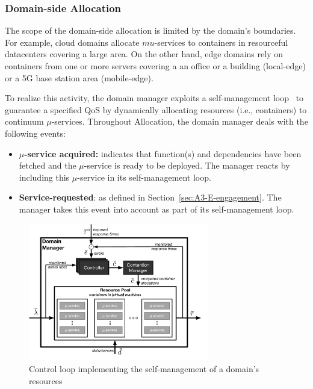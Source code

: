 \subsubsection*{Domain-side Allocation}

The scope of the domain-side allocation is limited by the domain's boundaries. For example, cloud domains allocate $mu$-services to containers in resourceful datacenters covering a large area. On the other hand, edge domains rely on containers from one or more servers covering a an office or a building (local-edge) or a 5G base station area (mobile-edge).

To realize this activity, the domain manager exploits a self-management loop~\cite{kephart2003vision} to guarantee a specified QoS by dynamically allocating resources (i.e., containers) to continuum $\mu$-services. Throughout Allocation, the domain manager deals with the following events:

\begin{itemize}
	
	\item \textbf{$\mu$-service acquired:} indicates that function(s) and dependencies have been fetched and the $\mu$-service is ready to be deployed. The manager reacts by including this $\mu$-service in its self-management loop.
	
	
	\item \textbf{Service-requested}: as defined in Section~\ref{sec:A3-E-engagement}. The manager takes this event into account as part of its self-management loop.
	
\end{itemize}

\begin{figure}[tbp]
	\includegraphics[width=0.7\textwidth]{figs/domain-manager-allocation}
	\caption{Control loop implementing the self-management of a domain's resources}
	\label{fig:A3Edomain-manager}
\end{figure}

